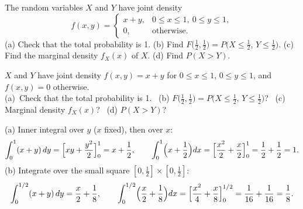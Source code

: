 
\begin{problem}
	The random variables $X$ and $Y$ have joint density
	\[ f(x,y)=\begin{cases}
			x+y, & 0\le x\le 1,\ 0\le y\le 1, \\
			0,   & \text{otherwise.}
		\end{cases} \]
	(a) Check that the total probability is 1.
	(b) Find $F\bigl(\frac12,\frac12\bigr)=P\bigl(X\le\frac12,\,Y\le\frac12\bigr)$.
	(c) Find the marginal density $f_X(x)$ of $X$.
	(d) Find $P(X>Y)$.
\end{problem}

\begin{slideproblem}
	$X$ and $Y$ have joint density $f(x,y)=x+y$ for $0\le x\le1$, $0\le y\le1$,
	and $f(x,y)=0$ otherwise.\\
	(a)~Check that the total probability is 1.
	\ (b) $F\bigl(\frac12,\frac12\bigr)=P\bigl(X\le\frac12,\,Y\le\frac12\bigr)$?
	\ (c) Marginal density $f_X(x)$?
	\ (d) $P(X>Y)$?
\end{slideproblem}

\begin{slides}
	\small
	\exstatement
	\pause
	\sol (a) Inner integral over $y$ ($x$ fixed), then over $x$:
	\vspace{-1mm}
	\[ \int_0^1(x+y)\,dy=\Bigl[xy+\frac{y^2}{2}\Bigr]_0^1=x+\frac12,
		\qquad
		\int_0^1\Bigl(x+\frac12\Bigr)dx=\Bigl[\frac{x^2}{2}+\frac{x}{2}\Bigr]_0^1
		=\frac12+\frac12=1. \]
	\pause
	(b) Integrate over the small square $[0,\frac12]\times[0,\frac12]$:
	\[ \int_0^{1/2}(x+y)\,dy=\frac{x}{2}+\frac18, \qquad
		\int_0^{1/2}\Bigl(\frac{x}{2}+\frac18\Bigr)dx
		=\Bigl[\frac{x^2}{4}+\frac{x}{8}\Bigr]_0^{1/2}
		=\frac1{16}+\frac1{16}=\frac18. \]
\end{slides}

